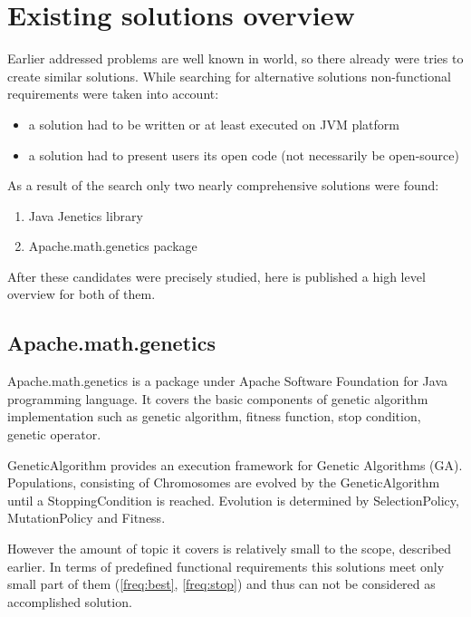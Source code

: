 \chapter{Existing solutions overview}

Earlier addressed problems are well known in world, so there already were tries to create similar solutions. While searching for alternative solutions non-functional requirements were taken into account:
\begin{itemize}

\item a solution had to be written or at least executed on JVM platform 

\item a solution had to present users its open code (not necessarily be open-source)
\end{itemize}

As a result of the search only two nearly comprehensive solutions were found: 
\begin{enumerate}
\item Java Jenetics library

\item Apache.math.genetics package
\end{enumerate}

After these candidates were precisely studied, here is published a high level overview for both of them.

\section{Apache.math.genetics}

Apache.math.genetics is a package under Apache Software Foundation for Java programming language. It covers the basic components of genetic algorithm implementation such as genetic algorithm, fitness function, stop condition, genetic operator.

GeneticAlgorithm provides an execution framework for Genetic Algorithms (GA). Populations, consisting of Chromosomes are evolved by the GeneticAlgorithm until a StoppingCondition is reached. Evolution is determined by SelectionPolicy, MutationPolicy and Fitness. \cite{apache_genetics}

However the amount of topic it covers is relatively small to the scope, described earlier. In terms of predefined functional requirements this solutions meet only small part of them (\ref{freq:best}, \ref{freq:stop}) and thus can not be considered as accomplished solution.

